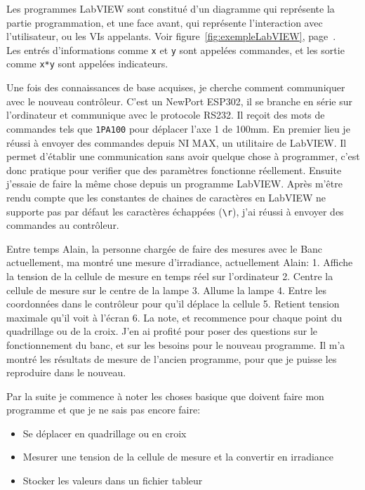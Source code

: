 \documentclass[12pt]{article}
\begin{document}
Les programmes LabVIEW sont constitué d'un diagramme qui représente la partie programmation, et une face avant, qui représente l'interaction avec l'utilisateur, ou les VIs appelants.
Voir figure~\ref{fig:exempleLabVIEW}, page~\pageref{fig:exempleLabVIEW}.\\
Les entrés d'informations comme \verb|x| et \verb|y| sont appelées commandes, et les sortie comme \verb|x*y| sont appelées indicateurs.


Une fois des connaissances de base acquises, je cherche comment communiquer avec le nouveau contrôleur.  
C'est un NewPort ESP302, il se branche en série sur l'ordinateur et communique avec le protocole RS232.  
Il reçoit des mots de commandes tels que \verb|1PA100| pour déplacer l'axe 1 de 100mm.  
En premier lieu je réussi à envoyer des commandes depuis NI MAX, un utilitaire de LabVIEW.  
Il permet d'établir une communication sans avoir quelque chose à programmer, c'est donc pratique pour verifier que des paramètres fonctionne réellement.  
Ensuite j'essaie de faire la même chose depuis un programme LabVIEW.  
Après m'être rendu compte que les constantes de chaines de caractères en LabVIEW ne supporte pas par défaut les caractères échappées (\texttt{\textbackslash r}), j'ai réussi à envoyer des commandes au contrôleur.  

Entre temps Alain, la personne chargée de faire des mesures avec le Banc actuellement, ma montré une mesure d'irradiance, actuellement Alain:  
1. Affiche la tension de la cellule de mesure en temps réel sur l'ordinateur  
2. Centre la cellule de mesure sur le centre de la lampe  
3. Allume la lampe  
4. Entre les coordonnées dans le contrôleur pour qu'il déplace la cellule  
5. Retient tension maximale qu'il voit à l'écran  
6. La note, et recommence pour chaque point du quadrillage ou de la croix.  
J'en ai profité pour poser des questions sur le fonctionnement du banc, et sur les besoins pour le nouveau programme.  
Il m'a montré les résultats de mesure de l'ancien programme, pour que je puisse les reproduire dans le nouveau.  

Par la suite je commence à noter les choses basique que doivent faire mon programme et que je ne sais pas encore faire:  
\begin{itemize}
	\item Se déplacer en quadrillage ou en croix  
	\item Mesurer une tension de la cellule de mesure et la convertir en irradiance  
	\item Stocker les valeurs dans un fichier tableur  
\end{itemize}
\end{document}
